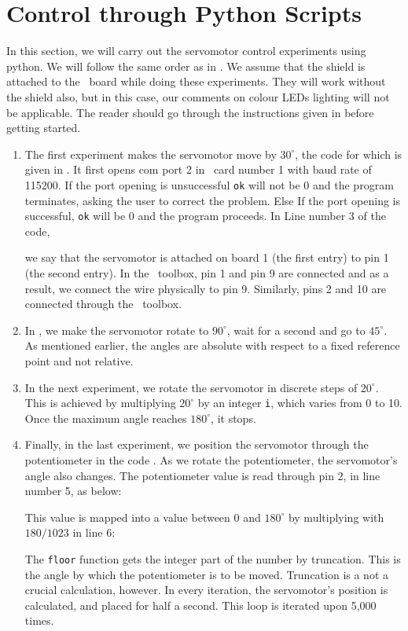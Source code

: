 \section{Control through Python Scripts}
\label{sec:servo-py}
In this section, we will carry out the servomotor control experiments
using python.  We will follow the same order as in
.  We assume that the shield is attached to the
\arduino\ board while doing these experiments.  They will work without
the shield also, but in this case, our comments on colour LEDs
lighting will not be applicable.  The reader should go through the
instructions given in  before getting started.
\begin{enumerate}
\item The first experiment makes the servomotor move by $30^\circ$,
  the code for which is given in .
  It first opens com port 2 in \arduino\ card number 1 with baud rate
  of 115200.  If the port opening is unsuccessful {\tt ok} will not be
  0 and the program terminates, asking the user to correct the
  problem.  Else If the port opening is successful, {\tt ok} will be 0
  and the program proceeds.  In Line number 3 of the code, \ie\
  
  we say that the servomotor is attached on board 1 (the first entry)
  to pin 1 (the second entry).  In the \scilab\ toolbox, pin 1 and pin
  9 are connected and as a result, we connect the wire physically to
  pin 9.  Similarly, pins 2 and 10 are connected through the
  \scilab\ toolbox.

\item In , we make the servomotor rotate
  to $90^\circ$, wait for a second and go to $45^\circ$.  As mentioned
  earlier, the angles are absolute with respect to a fixed reference
  point and not relative.  

\item In the next experiment, we rotate the servomotor in discrete
  steps of $20^\circ$.  This is achieved by multiplying $20^\circ$ by
  an integer {\tt i}, which varies from 0 to 10.  Once the maximum
  angle reaches $180^\circ$, it stops.  

\item Finally, in the last experiment, we position the servomotor
  through the potentiometer in the code .  As we
  rotate the potentiometer, the servomotor's angle also changes.  The
  potentiometer value is read through pin 2, in line number 5, as
  below:
  
  This value is mapped into a value between 0 and $180^\circ$ by
  multiplying with $180/1023$ in line 6:
  
  The {\tt floor} function gets the integer part of the number by
  truncation.  This is the angle by which the potentiometer is to be
  moved.  Truncation is a not a crucial calculation, however.  In
  every iteration, the servomotor's position is calculated, and placed
  for half a second.  This loop is iterated upon 5,000 times.
\end{enumerate}

